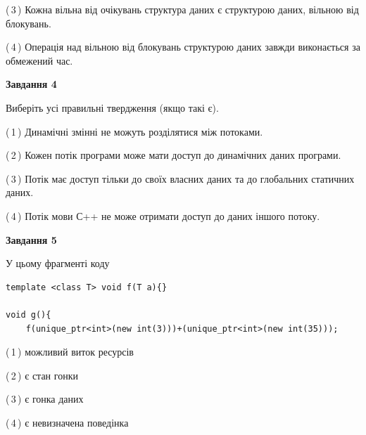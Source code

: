 \documentclass[12pt, ukrainian]{article}
\begin{document}
\begin {large}
{(\,3\,) Кожна вільна від очікувань структура даних є структурою даних, вільною від блокувань.%

(\,4\,) Операція над вільною від блокувань структурою даних завжди виконається за обмежений час.%



\begin{center}
\textbf{Завдання 4}
\end{center}
Виберіть усі правильні твердження (якщо такі є).\par
\vspace{2mm}

(\,1\,) Динамічні змінні не можуть розділятися між потоками.%

(\,2\,) Кожен потік програми може мати доступ до динамічних даних програми.%

(\,3\,) Потік має доступ тільки до своїх власних даних та до глобальних статичних даних.%

(\,4\,) Потік мови С++ не може отримати доступ до даних іншого потоку.%



\begin{center}
\textbf{Завдання 5}
\end{center}
У цьому фрагменті коду
\begin{verbatim}
template <class T> void f(T a){}

void g(){
    f(unique_ptr<int>(new int(3)))+(unique_ptr<int>(new int(35)));
\end{verbatim}

(\,1\,) можливий виток ресурсів%

(\,2\,) є стан гонки%

(\,3\,) є гонка даних%

(\,4\,) є невизначена поведінка%


}
\end {large}
\end{document}
